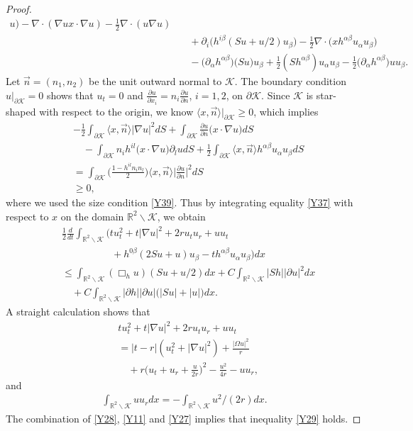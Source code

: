 \documentclass[11pt, reqno]{amsart}
\theoremstyle{definition}
\theoremstyle{remark}
\theoremstyle{definition}
\numberwithin{equation}{section}
\numberwithin{equation}{section}
\def\leq{\leqslant}
\def\geq{\geqslant}
\begin{document}
\begin{proof}
\begin{align}
u)-\nabla\cdot(\nabla ux\cdot\nabla
u)-\frac12\nabla\cdot(u\nabla u)\nonumber\\&\quad+
\partial_i\big(h^{i\beta}(Su+u/2)u_{\beta}\big)
-\frac12\nabla\cdot\big(xh^{\alpha\beta}u_{\alpha}u_{\beta}\big)
\nonumber\\&\quad-\big(\partial_{\alpha}h^{\alpha\beta}\big)\big(Su\big)u_{\beta}
+\frac12(Sh^{\alpha\beta})u_{\alpha}u_{\beta}-\frac12\big(\partial_{\alpha}h^{\alpha\beta}\big)uu_{\beta}.
\end{align}
Let $\vec{n}=(n_1,n_2)$ be the unit outward normal to $\mathcal
{K}$. The boundary condition $u|_{\partial\mathcal {K}}=0$ shows
that $u_t=0$ and $\frac{\partial u}{\partial x_i}=n_i\frac{\partial
u}{\partial n}$, $i=1,2$, on $\partial\mathcal {K}$. Since $\mathcal
{K}$ is star-shaped with respect to the origin, we know $\langle
x,\vec{n}\rangle|_{\partial\mathcal {K}}\geq0$, which implies
\begin{align*}
&-\frac12\int_{\partial\mathcal {K}}\langle x,\vec{n}\rangle|\nabla u|^2dS
+\int_{\partial\mathcal {K}}\frac{\partial u}{\partial n}\big(x\cdot\nabla u\big)dS
\\&\quad-\int_{\partial\mathcal {K}}n_ih^{il}\big(x\cdot\nabla u\big)\partial_ludS
+\frac12\int_{\partial\mathcal {K}}\langle x,\vec{n}\rangle h^{\alpha\beta}u_{\alpha}u_{\beta}dS
\\&=\int_{\partial\mathcal {K}}\Big(\frac{1-h^{il}n_in_l}2\Big)\langle x,\vec{n}\rangle\Big|\frac{\partial u}{\partial n}\Big|^2dS\\
&\geq0,
\end{align*}
where we used the size condition \eqref{Y39}.
Thus by integrating equality \eqref{Y37} with respect to $x$ on the
domain $\mathbb R^2\backslash\mathcal {K}$, we obtain
\begin{align}\label{Y28}
&\frac12\frac{d}{dt}\int_{\mathbb R^2\backslash\mathcal {K}}(tu_t^2+t|\nabla
u|^2+2ru_tu_r+uu_t\nonumber\\&\qquad\qquad\quad+h^{0\beta}(2Su+u)u_{\beta}-th^{\alpha\beta}u_{\alpha}u_{\beta})dx
\nonumber\\&\leq\int_{\mathbb R^2\backslash\mathcal {K}}(\Box_h
u)(Su+u/2)dx+C\int_{\mathbb R^2\backslash\mathcal {K}}|Sh||\partial u|^2dx
\nonumber\\&\quad+C\int_{\mathbb R^2\backslash\mathcal {K}}|\partial h||\partial u|\big(|Su|+|u|\big)dx.
\end{align}
A straight calculation shows that
\begin{align}\label{Y11}
&tu_t^2+t|\nabla u|^2+2ru_tu_r+uu_t\nonumber\\&=|t-r|(u_t^2+|\nabla
u|^2)+\frac{|\Omega u|^2}r\nonumber\\&\quad+r\Big(u_t+u_r+\frac
u{2r}\Big)^2-\frac {u^2}{4r}-uu_r,
\end{align}
and
\begin{align}\label{Y27}
\int_{\mathbb R^2\backslash\mathcal
{K}}uu_rdx=-\int_{\mathbb R^2\backslash\mathcal {K}}u^2/(2r)dx.
\end{align}
The combination of \eqref{Y28}, \eqref{Y11} and \eqref{Y27} implies
that inequality \eqref{Y29} holds.
\end{proof}
\end{document}
